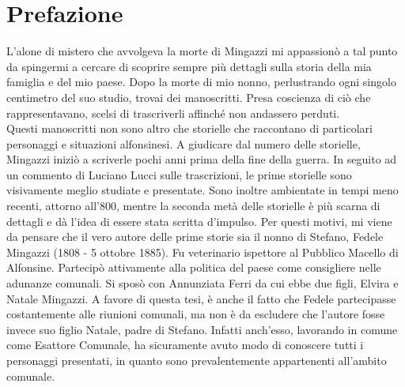 \thispagestyle{empty}
\chapter*{Prefazione}
L'alone di mistero che avvolgeva la morte di Mingazzi mi appassionò a tal punto da spingermi a cercare di scoprire sempre più dettagli sulla storia della mia famiglia e del mio paese. Dopo la morte di mio nonno, perlustrando ogni singolo centimetro del suo studio, trovai dei manoscritti. Presa coscienza di ciò che rappresentavano, scelsi di trascriverli affinché non andassero perduti.\\
\indent Questi manoscritti non sono altro che storielle che raccontano di particolari personaggi e situazioni alfonsinesi. A giudicare dal numero delle storielle, Mingazzi iniziò a scriverle pochi anni prima della fine della guerra. 
In seguito ad un commento di Luciano Lucci sulle trascrizioni, le prime storielle sono visivamente meglio studiate e presentate. Sono inoltre ambientate in tempi meno recenti, attorno all'800, mentre la seconda metà delle storielle è più scarna di dettagli e dà l'idea di essere stata scritta d'impulso. Per questi motivi, mi viene da pensare che il vero autore delle prime storie sia il nonno di Stefano, Fedele Mingazzi (1808 - 5 ottobre 1885). Fu veterinario ispettore al Pubblico Macello di Alfonsine. Partecipò attivamente alla politica del paese come consigliere nelle adunanze comunali. Si sposò con Annunziata Ferri da cui ebbe due figli, Elvira e Natale Mingazzi. A favore di questa tesi, è anche il fatto che Fedele partecipasse costantemente alle riunioni comunali, ma non è da escludere che l'autore fosse invece suo figlio Natale, padre di Stefano. Infatti anch'esso, lavorando in comune come Esattore Comunale, ha sicuramente avuto modo di conoscere tutti i personaggi presentati, in quanto sono prevalentemente appartenenti all'ambito comunale.\\

\begin{figure}[hbt]%
	\vspace{-1cm}
    \centering
	\vspace{-0.2cm}
\end{figure}

